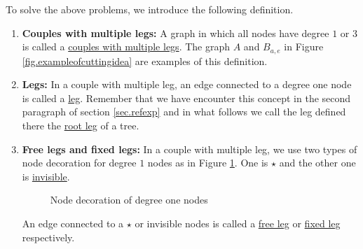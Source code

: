 To solve the above problems, we introduce the following definition.

\begin{defn}\label{def.couplemultileg}
\begin{enumerate}
    \item \textbf{Couples with multiple legs:} A graph in which all nodes have degree $1$ or $3$ is called a \underline{couples with multiple legs}. The graph $A$ and $B_{a,e}$ in Figure \ref{fig.exampleofcuttingidea} are examples of this definition.
    \item \textbf{Legs:} In a couple with multiple leg, an edge connected to a degree one node is called a \underline{leg}. Remember that we have encounter this concept in the second paragraph of section \ref{sec.refexp} and in what follows we call the leg defined there the \underline{root leg} of a tree.   
    \item \textbf{Free legs and fixed legs:} In a couple with multiple leg, we use two types of node decoration for degree $1$ nodes as in Figure \ref{fig.decorationdegreeone}. One is $\star$ and the other one is \underline{invisible}. 
    \begin{figure}[H]
    \centering
        \caption{Node decoration of degree one nodes}
        \label{fig.decorationdegreeone}
    \end{figure}
    An edge connected to a $\star$ or invisible nodes is called a \underline{free leg} or \underline{fixed leg} respectively. 
    

\end{enumerate}
\end{defn}
